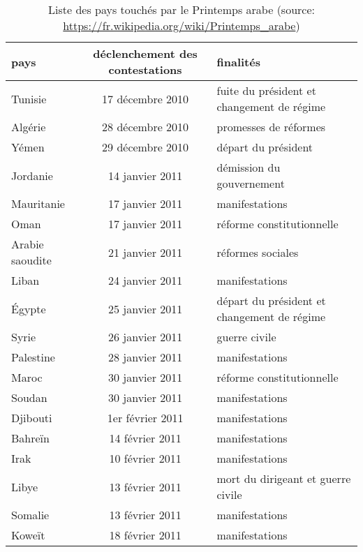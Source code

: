 \documentclass[symmetric,justified,marginals=raggedouter]{tufte-book}
\begin{document}
\begin{table*}
  \label{tab:printemps}
  \begin{tabular}{lcl}
    \toprule
    pays&déclenchement des contestations&finalités\\
    \midrule
Tunisie&17 décembre 2010&fuite du président et changement de régime\\
Algérie&28 décembre 2010&promesses de réformes\\
Yémen&29 décembre 2010&départ du président\\
Jordanie&14 janvier 2011&démission du gouvernement\\
Mauritanie&17 janvier 2011&manifestations\\
Oman&17 janvier 2011&réforme constitutionnelle\\
Arabie saoudite&21 janvier 2011&réformes sociales\\
Liban&24 janvier 2011&manifestations\\
Égypte&25 janvier 2011&départ du président et changement de régime\\
Syrie&26 janvier 2011&guerre civile\\
Palestine&28 janvier 2011&manifestations\\
Maroc&30 janvier 2011&réforme constitutionnelle\\
Soudan&30 janvier 2011&manifestations\\
Djibouti&1er février 2011&manifestations\\
Bahreïn&14 février 2011&manifestations\\
Irak&10 février 2011&manifestations\\
Libye&13 février 2011&mort du dirigeant et guerre civile\\
Somalie&13 février 2011&manifestations\\
Koweït&18 février 2011&manifestations\\
  \bottomrule
  \end{tabular}
  \bigskip
  \caption{Liste des pays touchés par le Printemps arabe (source: \url{https://fr.wikipedia.org/wiki/Printemps_arabe})}
\end{table*}
\end{document}
